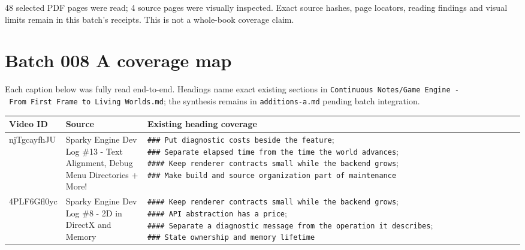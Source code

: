 48 selected PDF pages were read; 4 source pages were visually inspected. Exact source hashes, page locators, reading findings and visual limits remain in this batch's receipts. This is not a whole-book coverage claim.

\section{Batch 008 A coverage map}\label{appendix-877738f6f4d2-batch-008-a-coverage-map}

Each caption below was fully read end-to-end. Headings name exact existing sections in \texttt{Continuous\ Notes/Game\ Engine\ -\ From\ First\ Frame\ to\ Living\ Worlds.md}; the synthesis remains in \texttt{additions-a.md} pending batch integration.

{\def\LTcaptype{none} %
\begin{longtable}[]{@{}
  >{\raggedright\arraybackslash}p{}
  >{\raggedright\arraybackslash}p{}
  >{\raggedright\arraybackslash}p{}@{}}
\toprule\noalign{}
\begin{minipage}[b]{\linewidth}\raggedright
Video ID
\end{minipage} & \begin{minipage}[b]{\linewidth}\raggedright
Source
\end{minipage} & \begin{minipage}[b]{\linewidth}\raggedright
Existing heading coverage
\end{minipage} \\
\midrule\noalign{}
\endhead
\bottomrule\noalign{}
\endlastfoot
njTgcayfhJU & Sparky Engine Dev Log \#13 - Text Alignment, Debug Menu Directories + More! & \texttt{\#\#\#\ Put\ diagnostic\ costs\ beside\ the\ feature}; \texttt{\#\#\#\ Separate\ elapsed\ time\ from\ the\ time\ the\ world\ advances}; \texttt{\#\#\#\#\ Keep\ renderer\ contracts\ small\ while\ the\ backend\ grows}; \texttt{\#\#\#\ Make\ build\ and\ source\ organization\ part\ of\ maintenance} \\
4PLF6Gfl0yc & Sparky Engine Dev Log \#8 - 2D in DirectX and Memory & \texttt{\#\#\#\#\ Keep\ renderer\ contracts\ small\ while\ the\ backend\ grows}; \texttt{\#\#\#\#\ API\ abstraction\ has\ a\ price}; \texttt{\#\#\#\#\ Separate\ a\ diagnostic\ message\ from\ the\ operation\ it\ describes}; \texttt{\#\#\#\ State\ ownership\ and\ memory\ lifetime} \\

\end{longtable}}
